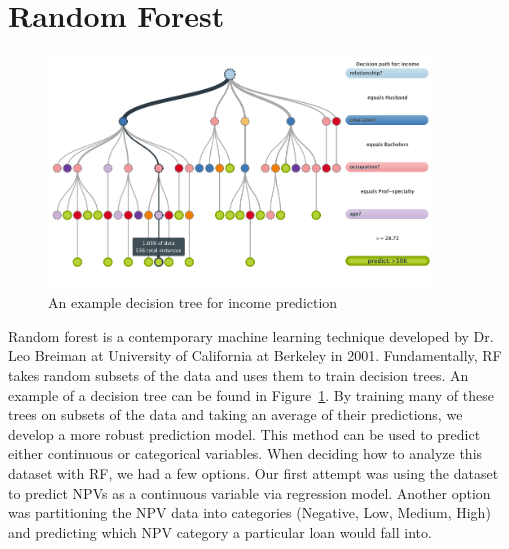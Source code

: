\documentclass[12 pt]{uncw_thesis}
\theoremstyle{plain}
\theoremstyle{remark}
\theoremstyle{definition}
\begin{document}
\section{Random Forest}
\begin{figure}
	\includegraphics[width=0.9\textwidth]{images/RF.png}
	\caption{An example decision tree for income prediction}
	\label{fig:DecisionTree}
\end{figure}
Random forest is a contemporary machine learning technique developed by Dr. Leo Breiman at University of California at Berkeley in 2001\cite{RF}. Fundamentally, RF takes random subsets of the data and uses them to train decision trees. An example of a decision tree can be found in Figure~\ref{fig:DecisionTree}. By training many of these trees on subsets of the data and taking an average of their predictions, we develop a more robust prediction model. This method can be used to predict either continuous or categorical variables. When deciding how to analyze this dataset with RF, we had a few options. Our first attempt was using the dataset to predict NPVs as a continuous variable via regression model. Another option was partitioning the NPV data into categories (Negative, Low, Medium, High) and predicting which NPV category a particular loan would fall into. 
\end{document}
